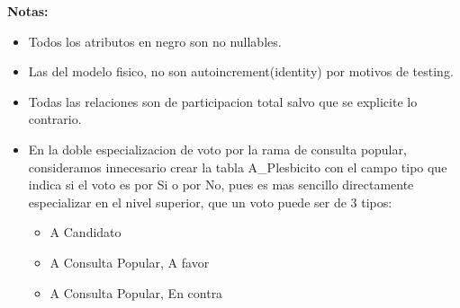 \textbf{Notas:} 
\begin{itemize}
	\item Todos los atributos en negro son no nullables.
	\item Las  del modelo fisico, no son autoincrement(identity) por motivos de testing.
	\item Todas las relaciones son de participacion total salvo que se explicite lo contrario.
	\item En la doble especializacion de voto por la rama de consulta popular, consideramos innecesario crear la tabla A\_Plesbicito con el campo tipo que indica si el voto es por Si o por No, pues es mas sencillo directamente especializar en el nivel superior, que un voto puede ser de 3 tipos:
	\begin{itemize}
		\item A Candidato
		\item A Consulta Popular, A favor
		\item A Consulta Popular, En contra
	\end{itemize}


\end{itemize}



